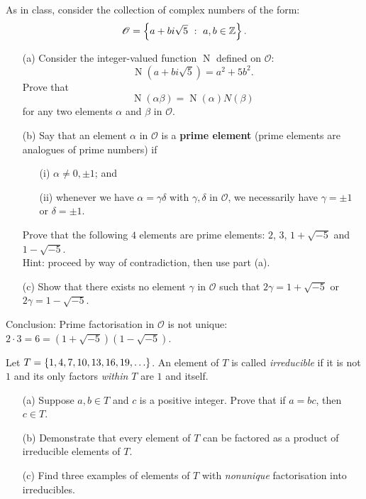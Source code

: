 \begin{problem}\label{problem 3.4}
As in class, consider the collection of complex numbers of the form:
\[\mathscr{O} = \left\{a + bi\sqrt{5}\ :\ a, b \in \mathbb Z\right\}.\]
\begin{itemize}
\item[(a)] Consider the integer-valued function $\operatorname{N}$ defined on $\mathscr{O}$:
\[\operatorname{N}(a + bi\sqrt{5}) = a^2 + 5b^2.\]
Prove that
\[\operatorname{N}(\alpha\beta) = \operatorname{N}(\alpha)N(\beta)\]
for any two elements $\alpha$ and $\beta$ in $\mathscr{O}$.
\item[(b)] Say that an element $\alpha$ in $\mathscr{O}$ is a \textbf{prime element} (prime elements are analogues of prime numbers) if
\begin{itemize}
\item[(i)] $\alpha \neq 0, \pm 1$; and
\item[(ii)] whenever we have $\alpha = \gamma \delta$ with $\gamma, \delta$ in $\mathscr{O}$, we necessarily have $\gamma = \pm 1$ or $\delta = \pm 1$.
\end{itemize}
Prove that the following $4$ elements are prime elements: $2$, $3$, $1 + \sqrt{-5}$ and $1 - \sqrt{-5}$.\\[0.5em]
{\footnotesize Hint: proceed by way of contradiction, then use part (a).} 
\item[(c)] Show that there exists no element $\gamma$ in $\mathscr{O}$ such that $2\gamma = 1+\sqrt{-5}$ or $2\gamma = 1-\sqrt{-5}$.
\end{itemize}
Conclusion: Prime factorisation in $\mathscr{O}$ is not unique: $2 \cdot 3 = 6 = (1 + \sqrt{-5})(1 - \sqrt{-5})$.
\end{problem}

\vspace*{0.1in}

\begin{problem}\label{problem 3.5}
Let $T = \left\{1,4,7,10,13,16,19,\ldots\right\}$. An element of $T$ is called \emph{irreducible} if it is not $1$ and its only factors \emph{within $T$} are $1$ and itself.
\begin{itemize}
\item[(a)] Suppose $a,b \in T$ and $c$ is a positive integer. Prove that if $a = bc$, then $c\in T$.
\item[(b)] Demonstrate that every element of $T$ can be factored as a product of irreducible elements of $T$. 
\item[(c)] Find three examples of elements of $T$ with \emph{nonunique} factorisation into irreducibles.
\end{itemize}
\end{problem}

